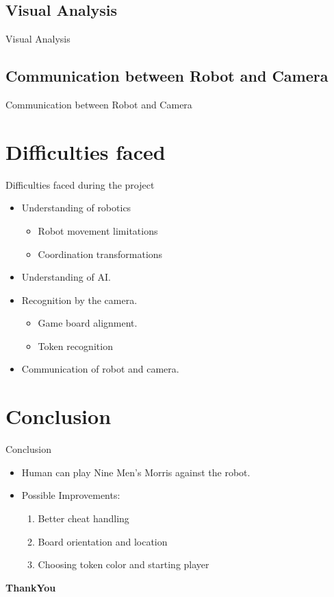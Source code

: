 \documentclass{beamer}
\begin{document}
\subsection{Visual Analysis}
\begin{frame}{Visual Analysis}

\end{frame}
\subsection{Communication between Robot and Camera}
\begin{frame}{Communication between Robot and Camera}

\end{frame}

\section{Difficulties faced}
\begin{frame}{Difficulties faced during the project}
\begin{itemize}
\item Understanding of robotics
\begin{itemize}
\item Robot movement limitations
\item Coordination transformations
\end{itemize}
\item Understanding of AI.
\item Recognition by the camera.
\begin{itemize}
\item Game board alignment.
\item Token recognition
\end{itemize}
\item Communication of robot and camera.
\end{itemize}
\end{frame}


\section{Conclusion}
\begin{frame}{Conclusion}
\begin{itemize}
\item Human can play Nine Men's Morris against the robot.
\item Possible Improvements:
\begin{enumerate}
\item Better cheat handling
\item Board orientation and location
\item Choosing token color and starting player
\end{enumerate}
\end{itemize}
\end{frame}


\begin{frame}
\begin{center}  
\Huge \textbf{ThankYou}
\end{center}
\end{frame}
\end{document}
